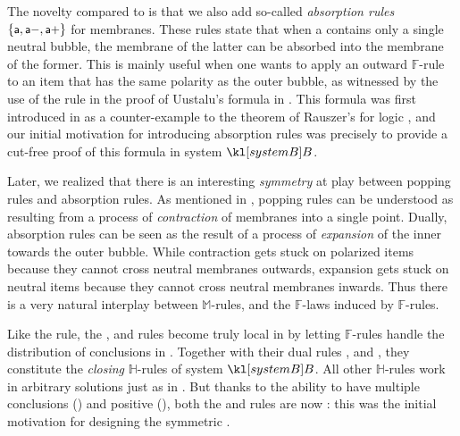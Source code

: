 \begin{description}
  The novelty compared to  is that we also add so-called
  \emph{absorption rules} $\{\text{\small$\mathsf{a}$},\text{\small$\mathsf{a{-}}$},\text{\small$\mathsf{a{+}}$}\}$ for membranes.
  These rules state that when a  contains only a single neutral bubble,
  the membrane of the latter can be absorbed into the membrane of the former.
  This is mainly useful when one wants to apply an outward $\mathbb{F}$-rule to
  an item that has the same polarity as the outer bubble, as witnessed by the
  use of the  rule in the proof of Uustalu's formula in
  . This formula was first introduced in
   as a counter-example to the 
  theorem of Rauszer's  for  logic
  , and our initial motivation for
  introducing absorption rules was precisely to provide a cut-free proof of this
  formula in system $\sysB$.

  Later, we realized that there is an interesting \emph{symmetry} at play
  between popping rules and absorption rules. As mentioned in
  , popping rules can be understood as resulting from a
  process of \emph{contraction} of membranes into a single point. Dually,
  absorption rules can be seen as the result of a process of \emph{expansion} of
  the inner  towards the outer bubble. While contraction gets stuck on
  polarized items because they cannot cross neutral membranes outwards,
  expansion gets stuck on neutral items because they cannot cross neutral
  membranes inwards. Thus there is a very natural interplay between
  $\mathbb{M}$-rules, and the $\mathbb{F}$-laws induced by $\mathbb{F}$-rules.

  \item[\textbf{\heating}] 
  Like the  rule, the \rsf{\bot{-}}, \rsf{\lor{-}} and
  \rsf{{\limp}{-}} rules become truly local in  by letting
  $\mathbb{F}$-rules handle the distribution of conclusions in .
  Together with their dual rules \rsf{\top{+}}, \rsf{\land{+}} and
  \rsf{{\limp}{+}}, they constitute the \emph{closing} $\mathbb{H}$-rules of
  system $\sysB$. All other $\mathbb{H}$-rules work in arbitrary solutions just
  as in . But thanks to the ability to have multiple conclusions
  () and positive  (), both the
  \rsf{\lor{+}} and \rsf{{\limp}{+}} rules are now \emph{}: this was
  the initial motivation for designing the symmetric .
\end{description}
